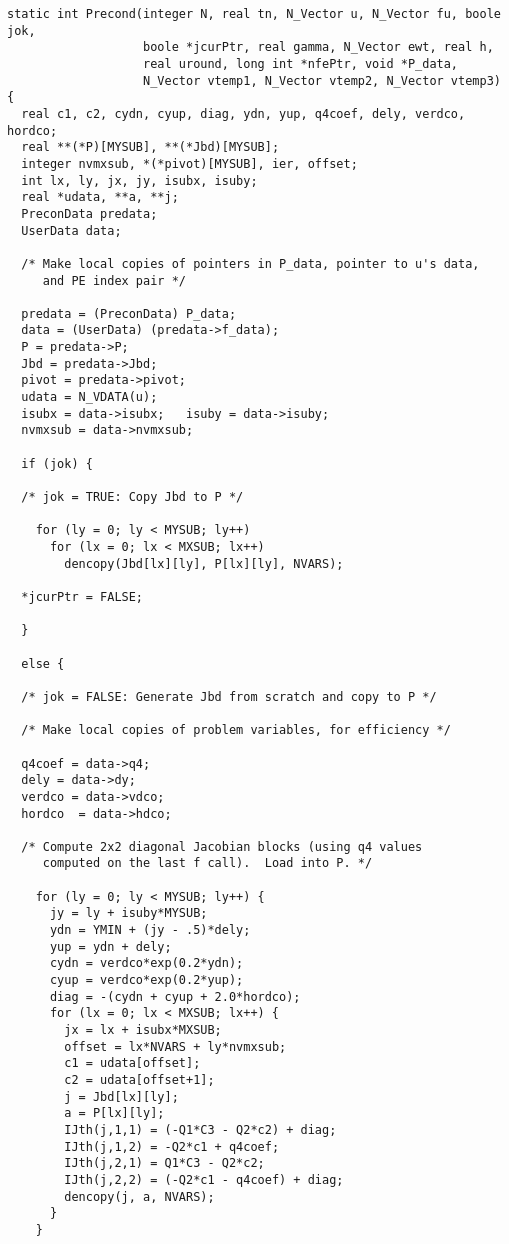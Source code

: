 \begin{verbatim}
static int Precond(integer N, real tn, N_Vector u, N_Vector fu, boole jok,
                   boole *jcurPtr, real gamma, N_Vector ewt, real h,
                   real uround, long int *nfePtr, void *P_data,
                   N_Vector vtemp1, N_Vector vtemp2, N_Vector vtemp3)
{
  real c1, c2, cydn, cyup, diag, ydn, yup, q4coef, dely, verdco, hordco;
  real **(*P)[MYSUB], **(*Jbd)[MYSUB];
  integer nvmxsub, *(*pivot)[MYSUB], ier, offset;
  int lx, ly, jx, jy, isubx, isuby;
  real *udata, **a, **j;
  PreconData predata;
  UserData data;

  /* Make local copies of pointers in P_data, pointer to u's data,
     and PE index pair */

  predata = (PreconData) P_data;
  data = (UserData) (predata->f_data);
  P = predata->P;
  Jbd = predata->Jbd;
  pivot = predata->pivot;
  udata = N_VDATA(u);
  isubx = data->isubx;   isuby = data->isuby;
  nvmxsub = data->nvmxsub;

  if (jok) {

  /* jok = TRUE: Copy Jbd to P */

    for (ly = 0; ly < MYSUB; ly++)
      for (lx = 0; lx < MXSUB; lx++)
        dencopy(Jbd[lx][ly], P[lx][ly], NVARS);

  *jcurPtr = FALSE;

  }

  else {

  /* jok = FALSE: Generate Jbd from scratch and copy to P */

  /* Make local copies of problem variables, for efficiency */

  q4coef = data->q4;
  dely = data->dy;
  verdco = data->vdco;
  hordco  = data->hdco;

  /* Compute 2x2 diagonal Jacobian blocks (using q4 values 
     computed on the last f call).  Load into P. */

    for (ly = 0; ly < MYSUB; ly++) {
      jy = ly + isuby*MYSUB;
      ydn = YMIN + (jy - .5)*dely;
      yup = ydn + dely;
      cydn = verdco*exp(0.2*ydn);
      cyup = verdco*exp(0.2*yup);
      diag = -(cydn + cyup + 2.0*hordco);
      for (lx = 0; lx < MXSUB; lx++) {
        jx = lx + isubx*MXSUB;
        offset = lx*NVARS + ly*nvmxsub;
        c1 = udata[offset];
        c2 = udata[offset+1];
        j = Jbd[lx][ly];
        a = P[lx][ly];
        IJth(j,1,1) = (-Q1*C3 - Q2*c2) + diag;
        IJth(j,1,2) = -Q2*c1 + q4coef;
        IJth(j,2,1) = Q1*C3 - Q2*c2;
        IJth(j,2,2) = (-Q2*c1 - q4coef) + diag;
        dencopy(j, a, NVARS);
      }
    }


\end{verbatim}
